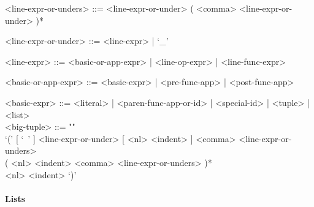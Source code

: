 \documentclass[diploma]{softlab-thesis}
\begin{document}
\begin{itemize}
\begin{grammar}
<line-expr-or-unders> ::=
<line-expr-or-under> ( <comma> <line-expr-or-under> )*

<line-expr-or-under> ::= <line-expr> | `_'

<line-expr> ::= <basic-or-app-expr> | <line-op-expr> | <line-func-expr>

<basic-or-app-expr> ::= <basic-expr> | <pre-func-app> | <post-func-app>

<basic-expr> ::=
<literal> | <paren-func-app-or-id> | <special-id> | <tuple> | <list>
\\

<big-tuple> ::= ""\\
`(' [ `\ ' ] <line-expr-or-under> [ <nl> <indent> ]
<comma> <line-expr-or-unders> \\
( <nl> <indent> <comma> <line-expr-or-unders> )* \\
<nl> <indent> `)'
\end{grammar}

\end{itemize}

\paragraph{Lists}
\end{document}
